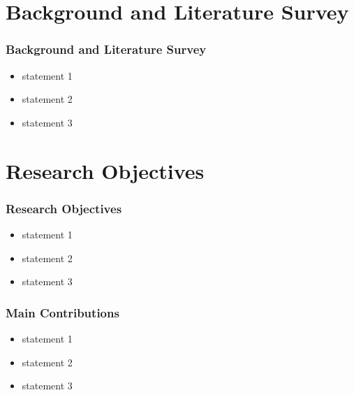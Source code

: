 \documentclass{beamer}
\begin{document}
\section{Background and Literature Survey} 
\begin{frame}[allowframebreaks]
   \frametitle{Background and Literature Survey}


  \begin{itemize}
       
       \item statement 1
       \item statement 2
       \item statement 3
   \end{itemize}


\end{frame}

\section{Research Objectives} 
\begin{frame}[allowframebreaks]
   \frametitle{Research Objectives}


  \begin{itemize}
       
       \item statement 1
       \item statement 2
       \item statement 3
   \end{itemize}


\end{frame}


\begin{frame}[allowframebreaks]
\frametitle{Main Contributions}
\begin{itemize}
   \item statement 1
    \item statement 2
    \item statement 3
\end{itemize}
\end{frame}







\end{document}
